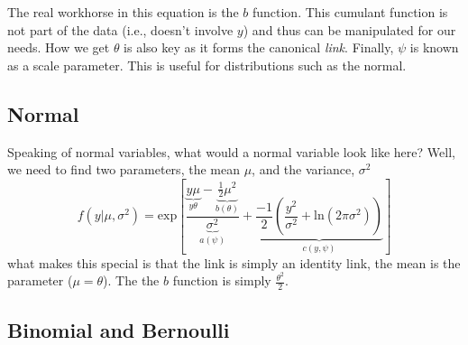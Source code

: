 The real workhorse in this equation is the $b$ function. This cumulant function is not part of the data (i.e., doesn't involve $y$) and thus can be manipulated for our needs. How we get $\theta$ is also key as it forms the canonical
{\it link}. Finally, $\psi$ is known as a scale parameter. This is useful for distributions such as the normal.

\subsection{Normal}

Speaking of normal variables, what would a normal variable look like here? Well, we need to find two parameters, the mean $\mu$, and the variance, $\sigma^2$
\begin{equation}
f\left(y|\mu,\sigma^2\right)=\mbox{exp}\left[\frac{\underbrace{y\mu}_\text{$y\theta$}-\underbrace{\frac{1}{2}\mu^2}_\text{$b\left(\theta\right)$}}{\underbrace{\sigma^2}_\text{$a\left(\psi\right)$}}+\underbrace{\frac{-1}{2}\left(\frac{y^2}{\sigma^2}+\mbox{ln}\left(2\pi\sigma^2\right)\right)}_\text{$c\left(y,\psi\right)$}\right]
\end{equation}
what makes this special is that the link is simply an identity link, the mean is the parameter ($\mu = \theta$). The the $b$ function is simply $\frac{\theta^2}{2}$.

\subsection{Binomial and Bernoulli}


